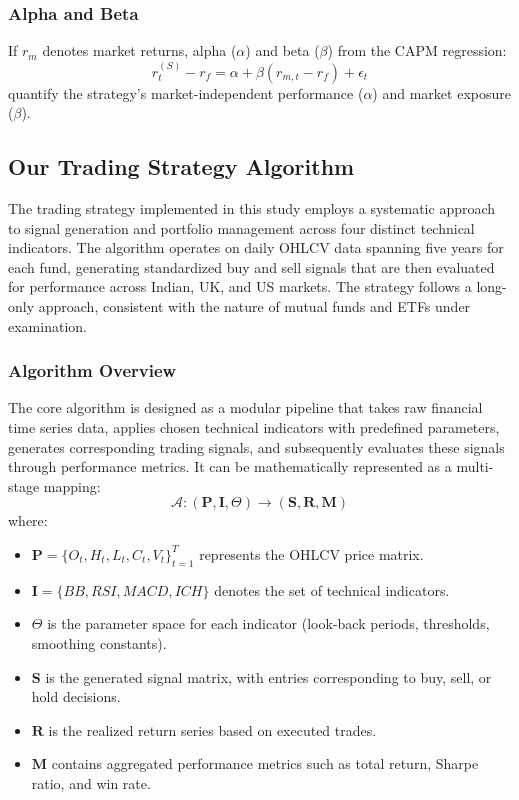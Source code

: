 \subsubsection{Alpha and Beta}  
If $r_m$ denotes market returns, alpha ($\alpha$) and beta ($\beta$) from the CAPM regression:
\[
r_t^{(S)} - r_f = \alpha + \beta (r_{m,t} - r_f) + \epsilon_t
\]
quantify the strategy's market-independent performance ($\alpha$) and market exposure ($\beta$).

\subsection{Our Trading Strategy Algorithm}

The trading strategy implemented in this study employs a systematic approach to signal generation and portfolio management across four distinct technical indicators. The algorithm operates on daily OHLCV data spanning five years for each fund, generating standardized buy and sell signals that are then evaluated for performance across Indian, UK, and US markets. The strategy follows a long-only approach, consistent with the nature of mutual funds and ETFs under examination.

\subsubsection{Algorithm Overview}

The core algorithm is designed as a modular pipeline that takes raw financial time series data, applies chosen technical indicators with predefined parameters, generates corresponding trading signals, and subsequently evaluates these signals through performance metrics. It can be mathematically represented as a multi-stage mapping:
\[
\mathcal{A}: (\mathbf{P}, \mathbf{I}, \Theta) \rightarrow (\mathbf{S}, \mathbf{R}, \mathbf{M})
\]
where:
\begin{itemize}
    \item $\mathbf{P} = \{O_t, H_t, L_t, C_t, V_t\}_{t=1}^T$ represents the OHLCV price matrix.
    \item $\mathbf{I} = \{BB, RSI, MACD, ICH\}$ denotes the set of technical indicators.
    \item $\Theta$ is the parameter space for each indicator (look-back periods, thresholds, smoothing constants).
    \item $\mathbf{S}$ is the generated signal matrix, with entries corresponding to buy, sell, or hold decisions.
    \item $\mathbf{R}$ is the realized return series based on executed trades.
    \item $\mathbf{M}$ contains aggregated performance metrics such as total return, Sharpe ratio, and win rate.
\end{itemize}

